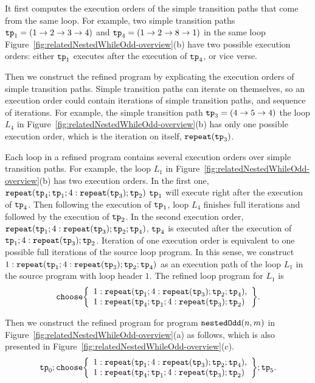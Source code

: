 It first computes the execution orders of
the simple transition paths that come from the same loop.
For example, two simple transition paths $\mathtt{tp}_1 = (1 \to 2 \to 3 \to 4)$ and 
$\mathtt{tp}_4 = (1 \to 2 \to 8 \to 1)$ in the same loop Figure~\ref{fig:relatedNestedWhileOdd-overview}(b) have two possible execution orders:
either $\mathtt{tp}_1$ executes after the execution of $\mathtt{tp}_4$, or vice verse.

Then we construct the refined program by explicating the execution orders of simple transition paths.
Simple transition paths can iterate on themselves, so an execution order could
contain iterations of simple transition paths, and sequence of iterations.
For example, the simple transition path $\mathtt{tp}_3 = (4 \to 5 \to 4)$
the loop $L_4$ in Figure~\ref{fig:relatedNestedWhileOdd-overview}(b) has only one possible execution order,
which is the iteration on itself, $\mathtt{repeat}(\mathtt{tp}_3)$.

Each loop in a refined program contains several execution orders over simple transition paths.
For example, the loop $L_1$ in Figure~\ref{fig:relatedNestedWhileOdd-overview}(b)
has two execution orders. In the first one,
$\mathtt{repeat}(\mathtt{tp}_4; \mathtt{tp}_1; 4:\mathtt{repeat}(\mathtt{tp}_3); \mathtt{tp}_2)$ 
$\mathtt{tp}_1$ will execute right after the execution of $\mathtt{tp}_4$.
Then following the execution of $\mathtt{tp}_1$, loop $L_4$ finishes full iterations and followed by the execution of $\mathtt{tp}_2$.
In the second execution order,
$\mathtt{repeat}(\mathtt{tp}_1; 4:\mathtt{repeat}(\mathtt{tp}_3); \mathtt{tp}_2; \mathtt{tp}_4)$,
$\mathtt{tp}_4$ is executed after the execution of $\mathtt{tp}_1; 4:\mathtt{repeat}(\mathtt{tp}_3); \mathtt{tp}_2$.
Iteration of one execution order is equivalent to one possible full iterations of the source loop program.
In this sense, we construct $1: \mathtt{repeat}(\mathtt{tp}_1; 4:\mathtt{repeat}(\mathtt{tp}_3); \mathtt{tp}_2; \mathtt{tp}_4)$ as an execution path of the loop $L_1$ in the source program with loop header $1$.
The refined loop program for $L_1$ is 
\[
\rpchoose{ 
 \begin{array}{l}
 1: \rprepeat(\tpath_1; 4:\rprepeat(\tpath_3); \tpath_2; \tpath_4), \\
 1: \rprepeat(\tpath_4; \tpath_1; 4:\rprepeat(\tpath_3); \tpath_2) 
 \end{array}
 }.
\]

Then we construct the refined program for program $\mathtt{nestedOdd}(n, m)$ in Figure~\ref{fig:relatedNestedWhileOdd-overview}(a) as follows, which is also presented in Figure~\ref{fig:relatedNestedWhileOdd-overview}(c).
\[
 \tpath_0 ; \rpchoose{ 
 \begin{array}{l}
    1: \rprepeat(\tpath_1; 4:\rprepeat(\tpath_3); \tpath_2; \tpath_4), \\
    1: \rprepeat(\tpath_4; \tpath_1; 4:\rprepeat(\tpath_3); \tpath_2) 
 \end{array}
 }; \tpath_5.
\]


